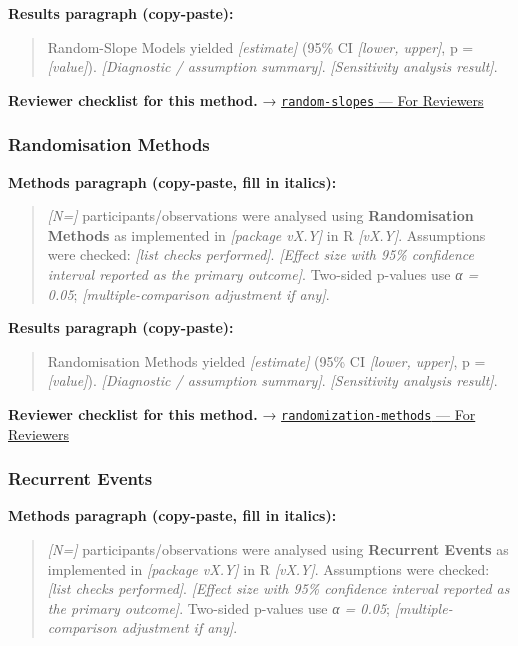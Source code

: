 \documentclass[
]{article}
\begin{document}
\textbf{Results paragraph (copy-paste):}

\begin{quote}
Random-Slope Models yielded \emph{{[}estimate{]}} (95\% CI
\emph{{[}lower, upper{]}}, p = \emph{{[}value{]}}). \emph{{[}Diagnostic
/ assumption summary{]}}. \emph{{[}Sensitivity analysis result{]}}.
\end{quote}

\textbf{Reviewer checklist for this method.} →
\href{../chapters/07-regression/random-slopes.Rmd\#for-reviewers}{\texttt{random-slopes}
--- For Reviewers}

\subsubsection{Randomisation Methods}\label{randomisation-methods}

\textbf{Methods paragraph (copy-paste, fill in italics):}

\begin{quote}
\emph{{[}N={]}} participants/observations were analysed using
\textbf{Randomisation Methods} as implemented in \emph{{[}package
vX.Y{]}} in R \emph{{[}vX.Y{]}}. Assumptions were checked: \emph{{[}list
checks performed{]}}. \emph{{[}Effect size with 95\% confidence interval
reported as the primary outcome{]}}. Two-sided p-values use \emph{α =
0.05}; \emph{{[}multiple-comparison adjustment if any{]}}.
\end{quote}

\textbf{Results paragraph (copy-paste):}

\begin{quote}
Randomisation Methods yielded \emph{{[}estimate{]}} (95\% CI
\emph{{[}lower, upper{]}}, p = \emph{{[}value{]}}). \emph{{[}Diagnostic
/ assumption summary{]}}. \emph{{[}Sensitivity analysis result{]}}.
\end{quote}

\textbf{Reviewer checklist for this method.} →
\href{../chapters/14-clinical/randomization-methods.Rmd\#for-reviewers}{\texttt{randomization-methods}
--- For Reviewers}

\subsubsection{Recurrent Events}\label{recurrent-events}

\textbf{Methods paragraph (copy-paste, fill in italics):}

\begin{quote}
\emph{{[}N={]}} participants/observations were analysed using
\textbf{Recurrent Events} as implemented in \emph{{[}package vX.Y{]}} in
R \emph{{[}vX.Y{]}}. Assumptions were checked: \emph{{[}list checks
performed{]}}. \emph{{[}Effect size with 95\% confidence interval
reported as the primary outcome{]}}. Two-sided p-values use \emph{α =
0.05}; \emph{{[}multiple-comparison adjustment if any{]}}.
\end{quote}
\end{document}
